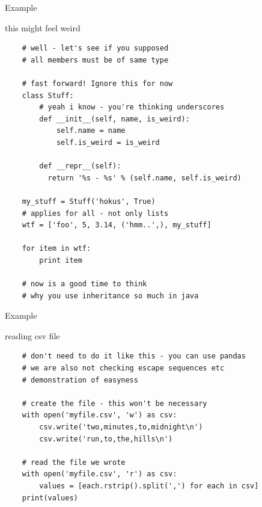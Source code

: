 \documentclass{bredelebeamer}
\begin{document}
\begin{frame}[fragile]{Example}
  \begin{exampleblock}{this might feel weird}
    \begin{lstlisting}
    # well - let's see if you supposed
    # all members must be of same type
    
    # fast forward! Ignore this for now
    class Stuff:
        # yeah i know - you're thinking underscores
        def __init__(self, name, is_weird):
            self.name = name
            self.is_weird = is_weird
            
        def __repr__(self):
          return '%s - %s' % (self.name, self.is_weird)
            
    my_stuff = Stuff('hokus', True)
    # applies for all - not only lists
    wtf = ['foo', 5, 3.14, ('hmm..',), my_stuff]
    
    for item in wtf:
        print item
        
    # now is a good time to think
    # why you use inheritance so much in java
    \end{lstlisting}
  \end{exampleblock}
\end{frame}

\begin{frame}[fragile]{Example}
  \begin{exampleblock}{reading csv file}
    \begin{lstlisting}
    # don't need to do it like this - you can use pandas
    # we are also not checking escape sequences etc
    # demonstration of easyness
    
    # create the file - this won't be necessary
    with open('myfile.csv', 'w') as csv:
        csv.write('two,minutes,to,midnight\n')
        csv.write('run,to,the,hills\n')
        
    # read the file we wrote
    with open('myfile.csv', 'r') as csv:
        values = [each.rstrip().split(',') for each in csv]
    print(values)
    \end{lstlisting}
  \end{exampleblock}
\end{frame}

\end{document}
